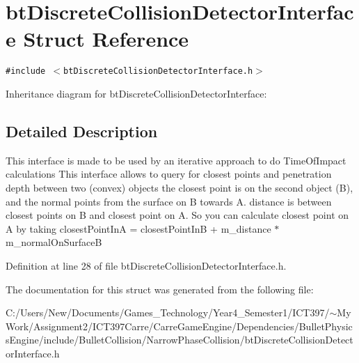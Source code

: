 \hypertarget{structbt_discrete_collision_detector_interface}{
\section{btDiscreteCollisionDetectorInterface Struct Reference}
\label{structbt_discrete_collision_detector_interface}
}
{\tt \#include $<$btDiscreteCollisionDetectorInterface.h$>$}

Inheritance diagram for btDiscreteCollisionDetectorInterface:

\subsection{Detailed Description}
This interface is made to be used by an iterative approach to do TimeOfImpact calculations This interface allows to query for closest points and penetration depth between two (convex) objects the closest point is on the second object (B), and the normal points from the surface on B towards A. distance is between closest points on B and closest point on A. So you can calculate closest point on A by taking closestPointInA = closestPointInB + m\_\-distance $\ast$ m\_\-normalOnSurfaceB 

Definition at line 28 of file btDiscreteCollisionDetectorInterface.h.

The documentation for this struct was generated from the following file:\begin{CompactItemize}
\item 
C:/Users/New/Documents/Games\_\-Technology/Year4\_\-Semester1/ICT397/$\sim$My Work/Assignment2/ICT397Carre/CarreGameEngine/Dependencies/BulletPhysicsEngine/include/BulletCollision/NarrowPhaseCollision/btDiscreteCollisionDetectorInterface.h\end{CompactItemize}
